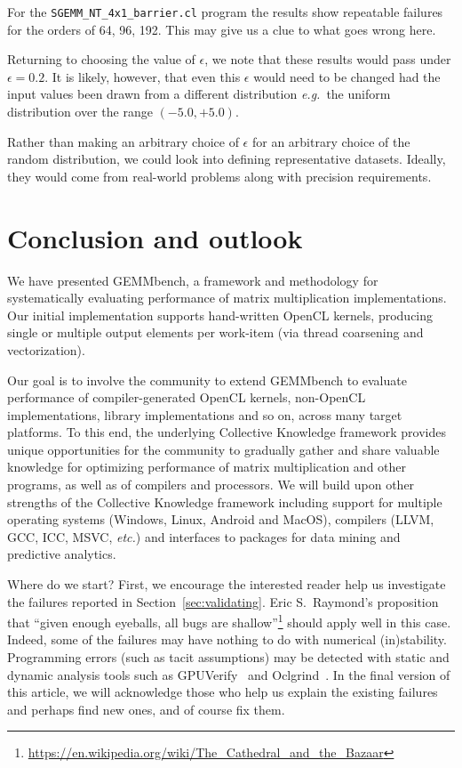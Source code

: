 \documentclass{acm_proc_article-sp} %
\begin{document}
For the \verb|SGEMM_NT_4x1_barrier.cl| program the results show repeatable
failures for the orders of 64, 96, 192.
%
This may give us a clue to what goes wrong here.

Returning to choosing the value of $\epsilon$, we note that these results would pass
under $\epsilon = 0.2$.
%
It is likely, however, that even this $\epsilon$ would need to be changed had
the input values been drawn from a different distribution {\em e.g.}\ the
uniform distribution over the range $(-5.0, +5.0)$.

Rather than making an arbitrary choice of $\epsilon$ for an arbitrary choice of
the random distribution, we could look into defining representative datasets.
%
Ideally, they would come from real-world problems along with precision
requirements.
%


\section{Conclusion and outlook}

We have presented GEMMbench, a framework and methodology for systematically
evaluating performance of matrix multiplication implementations.
%
Our initial implementation supports hand-written OpenCL kernels, producing
single or multiple output elements per work-item (via thread coarsening and
vectorization).
%

Our goal is to involve the community to extend GEMMbench to evaluate
performance of compiler-generated OpenCL kernels, non-OpenCL implementations,
library implementations and so on, across many target platforms.
%
To this end, the underlying Collective Knowledge framework provides unique
opportunities for the community to gradually gather and share valuable
knowledge for optimizing performance of matrix multiplication and other
programs, as well as of compilers and processors.
%
We will build upon other strengths of the Collective Knowledge framework including
support for multiple operating systems (Windows, Linux, Android and MacOS),
compilers (LLVM, GCC, ICC, MSVC, {\em etc.}) and interfaces to packages for
data mining and predictive analytics.

Where do we start?
%
First, we encourage the interested reader help us investigate the failures
reported in Section~\ref{sec:validating}.
%
Eric S.\ Raymond's proposition that ``given enough eyeballs, all bugs are
shallow''\footnote{\url{https://en.wikipedia.org/wiki/The_Cathedral_and_the_Bazaar}}
should apply well in this case.
%
Indeed, some of the failures may have nothing to do with numerical
(in)stability. 
%
Programming errors (such as tacit assumptions) may be detected with static and
dynamic analysis tools such as GPUVerify~\cite{GPUVerify} and
Oclgrind~\cite{Oclgrind}.
%
In the final version of this article, we will acknowledge those who help us
explain the existing failures and perhaps find new ones, and of course fix them.
\end{document}
